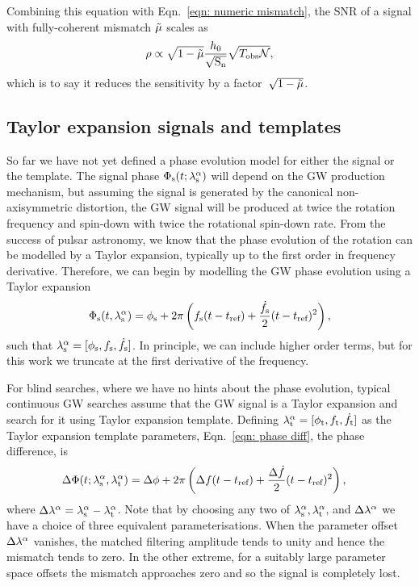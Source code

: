 \documentclass[../full_thesis/full_thesis.tex]{subfiles}
\begin{document}
Combining this equation with Eqn.~\eqref{eqn: numeric mismatch}, the SNR of a signal
with fully-coherent mismatch $\tilde{\mu}$ scales as
\begin{equation}
\rho \propto \sqrt{1-\tilde{\mu}} \frac{h_{0}}{\sqrt{\textrm{S}_{\textrm{n}}}}
                               \sqrt{T_{\mathrm{obs}} \mathcal{N}},
\end{equation}
which is to say it reduces the sensitivity by a factor~$\sqrt{1-\tilde{\mu}}$.



\subsection{Taylor expansion signals and templates}
So far we have not yet defined a phase evolution model for either the signal or the template.
The signal phase $\Phi_{\textrm{s}}(t; {\lambda}_\textrm{s}^{\alpha})$ will depend on the GW production mechanism,
but assuming the signal is generated by the canonical non-axisymmetric distortion,
the GW signal will be produced at twice the rotation frequency and spin-down
with twice the rotational spin-down rate. From the success of pulsar astronomy,
we know that the phase evolution of the rotation can be modelled by a Taylor
expansion, typically up to the first order in frequency derivative. Therefore,
we can begin by modelling the GW phase evolution using a Taylor expansion
\begin{equation}
\Phi_{\textrm{s}} (t, {\lambda}_\textrm{s}^{\alpha}) = \phi_{\textrm{s}} + 2\pi \left(f_{\textrm{s}} (t - t_{\textrm{ref}})
+ \frac{\dot{f}_{\textrm{s}}}{2}(t - t_{\textrm{ref}})^{2} \right),
\label{eqn: Taylor lambda signal}
\end{equation}
such that ${\lambda}_\textrm{s}^{\alpha} = [\phi_{\textrm{s}}, f_{\textrm{s}}, \dot{f}_{\textrm{s}}]$. In principle, we can include
higher order terms, but for this work we truncate at the first
derivative of the frequency.

For blind searches, where we have no hints about the phase evolution,
typical continuous GW searches assume that the GW signal is a Taylor expansion and
search for it using Taylor expansion template. Defining ${\lambda}_\textrm{t}^{\alpha} = [\phi_{\textrm{t}},
{f_{\textrm{t}}}, \dot{f}_{\textrm{t}}]$ as the Taylor expansion
template parameters, Eqn.~\eqref{eqn: phase diff}, the phase difference, is
\begin{align}
\Delta \Phi(t; {\lambda}_\textrm{s}^{\alpha}, {\lambda}_\textrm{t}^{\alpha})  & =
\Delta\phi + 2\pi\left(\Delta f(t-t_{\textrm{ref}}) +
\frac{\Delta\dot{f}}{2}(t - t_{\textrm{ref}})^{2}\right),
\label{eqn: Delta Phi}
\end{align}
where $\Delta\lambda^{\alpha} = {\lambda}_\textrm{s}^{\alpha} - {\lambda}_\textrm{t}^{\alpha}$. Note that
by choosing any two of ${\lambda}_\textrm{s}^{\alpha}, {\lambda}_\textrm{t}^{\alpha}$, and $\Delta\lambda^{\alpha}$
we have a choice of three equivalent parameterisations.
When the parameter offset $\Delta\lambda^{\alpha}$ vanishes, the matched filtering
amplitude tends to unity and hence the mismatch tends to zero. In the other
extreme, for a suitably
large parameter space offsets the mismatch approaches zero and so the signal is
completely lost.
\end{document}
